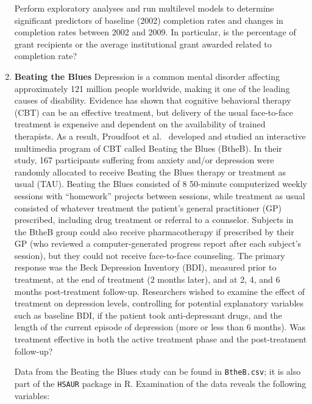 \documentclass[
]{krantz}
\begin{document}
\begin{enumerate}
  Perform exploratory analyses and run multilevel models to determine significant predictors of baseline (2002) completion rates and changes in completion rates between 2002 and 2009. In particular, is the percentage of grant recipients or the average institutional grant awarded related to completion rate?
\item
  \textbf{Beating the Blues} Depression is a common mental disorder affecting approximately 121 million people worldwide, making it one of the leading causes of disability. Evidence has shown that cognitive behavioral therapy (CBT) can be an effective treatment, but delivery of the usual face-to-face treatment is expensive and dependent on the availability of trained therapists. As a result, Proudfoot et al.~\citeyearpar{Proudfoot2003} developed and studied an interactive multimedia program of CBT called Beating the Blues (BtheB). In their study, 167 participants suffering from anxiety and/or depression were randomly allocated to receive Beating the Blues therapy or treatment as usual (TAU). Beating the Blues consisted of 8 50-minute computerized weekly sessions with ``homework'' projects between sessions, while treatment as usual consisted of whatever treatment the patient's general practitioner (GP) prescribed, including drug treatment or referral to a counselor. Subjects in the BtheB group could also receive pharmacotherapy if prescribed by their GP (who reviewed a computer-generated progress report after each subject's session), but they could not receive face-to-face counseling. The primary response was the Beck Depression Inventory (BDI), measured prior to treatment, at the end of treatment (2 months later), and at 2, 4, and 6 months post-treatment follow-up. Researchers wished to examine the effect of treatment on depression levels, controlling for potential explanatory variables such as baseline BDI, if the patient took anti-depressant drugs, and the length of the current episode of depression (more or less than 6 months). Was treatment effective in both the active treatment phase and the post-treatment follow-up?

  Data from the Beating the Blues study can be found in \texttt{BtheB.csv}; it is also part of the \texttt{HSAUR} package \citet{Everitt2006} in R. Examination of the data reveals the following variables:


\end{enumerate}
\end{document}
